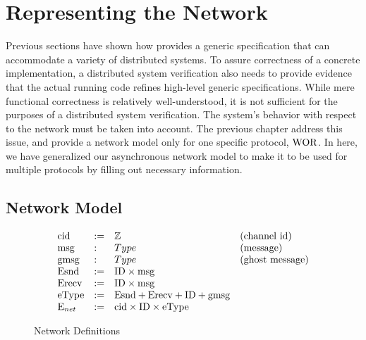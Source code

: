 \section{Representing the Network}
\label{chapter:witnesspassing:sec:low-level-implementation}


Previous sections have shown how \sysname{} provides a generic specification
that can accommodate a variety of distributed systems.  To assure correctness of
a concrete implementation, a distributed system verification also needs to
provide evidence that the actual running code refines high-level generic
specifications. While mere functional correctness is relatively well-understood,
it is not sufficient for the purposes of a distributed system verification. The
system's behavior with respect to the network must be taken into account. 
The previous chapter address this issue, and 
provide a network model only for one specific protocol, $\mathrm{WOR}$. 
In here, we have generalized our  asynchronous network model to make it to be used 
for multiple protocols by filling out necessary information. 


\subsection{Network Model}
\label{chapter:witnesspassing:subsec:network-model}

\begin{figure}
\begin{small}
\raggedright
$$
\begin{array}{llll}
\mathrm{cid} & := & \mathbb{Z} & \mbox{(channel id)} \\
\mathrm{msg} & : & Type & \mbox{(message)} \\
\mathrm{gmsg} & : & Type & \mbox{(ghost message)} \\
\mathrm{Esnd} & := & \mathrm{ID} \times \mathrm{msg} \\
\mathrm{Erecv} & := & \mathrm{ID} \times \mathrm{msg} \\
\mathrm{eType} & := & \mathrm{Esnd} + \mathrm{Erecv} + \mathrm{ID} + \mathrm{gmsg} \\
\mathrm{E}_{net} & := & \mathrm{cid} \times \mathrm{ID} \times \mathrm{eType} \\
\end{array}
$$
\end{small}
\caption{Network Definitions}
\label{fig:chapter:witnesspassing:net-defs}
\end{figure}

